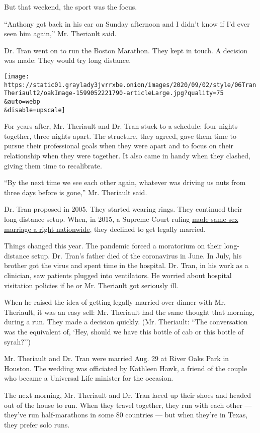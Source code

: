 But that weekend, the sport was the focus.

``Anthony got back in his car on Sunday afternoon and I didn't know if
I'd ever seen him again,'' Mr. Theriault said.

Dr. Tran went on to run the Boston Marathon. They kept in touch. A
decision was made: They would try long distance.

\texttt{[image: https://static01.graylady3jvrrxbe.onion/images/2020/09/02/style/06TranTheriault2/oakImage-1599052221790-articleLarge.jpg?quality=75\\\&auto=webp\\\&disable=upscale]}

For years after, Mr. Theriault and Dr. Tran stuck to a schedule: four
nights together, three nights apart. The structure, they agreed, gave
them time to pursue their professional goals when they were apart and to
focus on their relationship when they were together. It also came in
handy when they clashed, giving them time to recalibrate.

``By the next time we see each other again, whatever was driving us nuts
from three days before is gone,'' Mr. Theriault said.

Dr. Tran proposed in 2005. They started wearing rings. They continued
their long-distance setup. When, in 2015, a Supreme Court ruling
\href{https://www.nytimes3xbfgragh.onion/2015/06/27/us/supreme-court-same-sex-marriage.html}{made
same-sex marriage a right nationwide}, they declined to get legally
married.

Things changed this year. The pandemic forced a moratorium on their
long-distance setup. Dr. Tran's father died of the coronavirus in June.
In July, his brother got the virus and spent time in the hospital. Dr.
Tran, in his work as a clinician, saw patients plugged into ventilators.
He worried about hospital visitation policies if he or Mr. Theriault got
seriously ill.

When he raised the idea of getting legally married over dinner with Mr.
Theriault, it was an easy sell: Mr. Theriault had the same thought that
morning, during a run. They made a decision quickly. (Mr. Theriault:
``The conversation was the equivalent of, `Hey, should we have this
bottle of cab or this bottle of syrah?'')

Mr. Theriault and Dr. Tran were married Aug. 29 at River Oaks Park in
Houston. The wedding was officiated by Kathleen Hawk, a friend of the
couple who became a Universal Life minister for the occasion.

The next morning, Mr. Theriault and Dr. Tran laced up their shoes and
headed out of the house to run. When they travel together, they run with
each other --- they've run half-marathons in some 80 countries --- but
when they're in Texas, they prefer solo runs.

